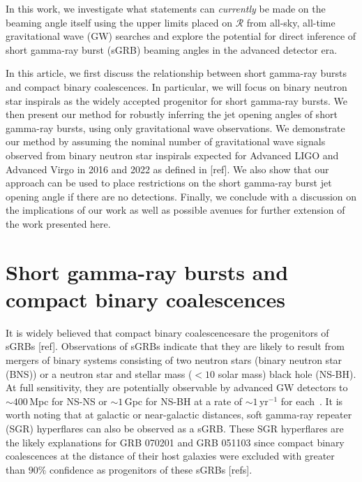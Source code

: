\documentclass[twocolumn,nofootinbib]{revtex4-1}
\newcommand{\grbrate}{{{\mathcal R}_{\mathrm{grb}}}}
\newcommand{\cbcrate}{{{\mathcal R}}}
\def\bns#1{binary neutron star#1 (BNS#1)\gdef\bns{BNS}}
\def\gw#1{gravitational wave#1 (GW#1)\gdef\gw{GW}}
\def\sgrb#1{short gamma-ray burst#1 (sGRB#1)\gdef\sgrb{sGRB}}
\newcommand{\about}[1]{{\color{blue}{[THIS SECTION: #1]}}}
\begin{document}
In this work, we investigate what
statements can \emph{currently} be made on the beaming angle itself using the
upper limits placed on $\cbcrate$ from all-sky, all-time \gw{} searches and
explore the potential for direct inference of \sgrb{}  beaming angles in the
advanced detector era.

In this article, we first discuss the relationship between short gamma-ray bursts
and compact binary coalescences. In particular, we will focus on binary neutron 
star inspirals as the widely accepted progenitor for short gamma-ray bursts.
We then present our method for robustly inferring the jet opening angles of 
short gamma-ray bursts, using only gravitational wave observations. We 
demonstrate our method by assuming the nominal number of gravitational
wave signals observed from binary neutron star inspirals expected for
Advanced LIGO and Advanced Virgo in 2016 and 2022 as defined in [ref]. 
We also show that our approach can be used to place restrictions on the
short gamma-ray burst jet opening angle if there are no detections.
Finally, we conclude with a discussion on the implications of our work
as well as possible avenues for further extension of the work presented
here.

\section{Short gamma-ray bursts and compact binary coalescences}
\label{sec:sgrbs}

\about{Some description of BNS and how they are likely progenitors of short
gamma-ray bursts (This section describes our model and how sGRBs relate to BNS, currently with text taken from LVC search plans}

It is widely believed that compact binary coalescencesare the progenitors of \sgrb{s} [ref]. 
Observations of \sgrb{s} indicate that they are likely to result from mergers of binary systems consisting of  two neutron stars (\bns{}) or a neutron star and stellar mass ($< 10$ solar mass) black hole (NS-BH). 
At full sensitivity, they are potentially observable by advanced GW detectors to $\sim 400\,$Mpc for NS-NS or $\sim 1\,$Gpc for NS-BH at a rate of $\sim 1\,$yr$^{-1}$ for each~\cite{MetzgerBerger, Clark:2014ut}. 
It is worth noting that at galactic or near-galactic distances, soft gamma-ray repeater (SGR) hyperflares can also be observed as a \sgrb{}. 
These SGR hyperflares are the likely explanations for GRB 070201 and GRB 051103 since compact binary coalescences at the distance of their host galaxies were excluded with greater than $90\%$ confidence as progenitors of these \sgrb{s} [refs]. 
\end{document}
